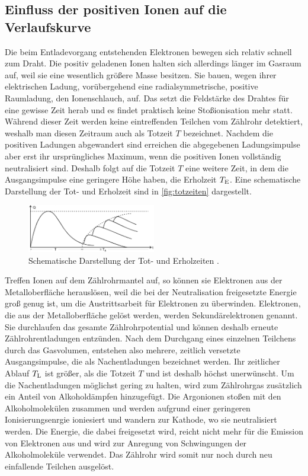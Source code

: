 \subsection{Einfluss der positiven Ionen auf die Verlaufskurve}
\label{subsec:posIon}

Die beim Entladevorgang entstehenden Elektronen bewegen sich relativ schnell zum Draht. Die positiv geladenen Ionen halten sich allerdings länger im Gasraum auf, weil sie eine wesentlich größere Masse besitzen. Sie bauen, wegen ihrer elektrischen Ladung, vorübergehend
eine radialsymmetrische, positive Raumladung, den Ionenschlauch, auf. Das setzt die Feldstärke des Drahtes für eine gewisse Zeit herab und es findet praktisch keine Stoßionisation mehr statt. Während dieser Zeit werden keine eintreffenden Teilchen vom Zählrohr detektiert,
weshalb man diesen Zeitraum auch als Totzeit $T$ bezeichnet. Nachdem die positiven Ladungen abgewandert sind erreichen die abgegebenen Ladungsimpulse aber erst ihr ursprüngliches Maximum, wenn die positiven Ionen vollständig neutralisiert sind.
Deshalb folgt auf die Totzeit $T$ eine weitere Zeit, in dem die Ausgangsimpulse eine geringere Höhe haben, die Erholzeit $T_{\text E}$. Eine schematische Darstellung der Tot- und Erholzeit sind in \autoref{fig:totzeiten} dargestellt.
\begin{figure}[H]
    \centering
    \includegraphics[width=0.5\textwidth]{data/totzeiten.png}
    \caption{Schematische Darstellung der Tot- und Erholzeiten \cite{Anleitung703}.}
    \label{fig:totzeiten}
\end{figure}

Treffen Ionen auf dem Zählrohrmantel auf, so können sie Elektronen aus der Metalloberfläche herauslösen, weil die bei der Neutralisation freigesetzte Energie groß genug ist, um die Austrittsarbeit für Elektronen zu überwinden.
Elektronen, die aus der Metalloberfläche gelöst werden, werden Sekundärelektronen genannt. Sie durchlaufen das gesamte Zählrohrpotential und können deshalb erneute Zählrohrentladungen entzünden. Nach dem Durchgang eines einzelnen Teilchens 
durch das Gasvolumen, entstehen also mehrere, zeitlich versetzte Ausgangsimpulse, die als Nachentladungen bezeichnet werden. Ihr zeitlicher Ablauf $T_{\text L}$ ist größer, als die Totzeit $T$ und ist deshalb höchst unerwünscht.
Um die Nachentladungen möglichst gering zu halten, wird zum Zählrohrgas zusätzlich ein Anteil von Alkoholdämpfen hinzugefügt. Die Argonionen stoßen mit den Alkoholmolekülen zusammen und werden aufgrund einer geringeren Ionisierungsenrgie ioniesiert und wandern zur Kathode, wo sie neutralisiert werden.
Die Energie, die dabei freigesetzt wird, reicht nicht mehr für die Emission von Elektronen aus und wird zur Anregung von Schwingungen der Alkoholmoleküle verwendet. Das Zählrohr wird somit nur noch durch neu einfallende Teilchen ausgelöst.

